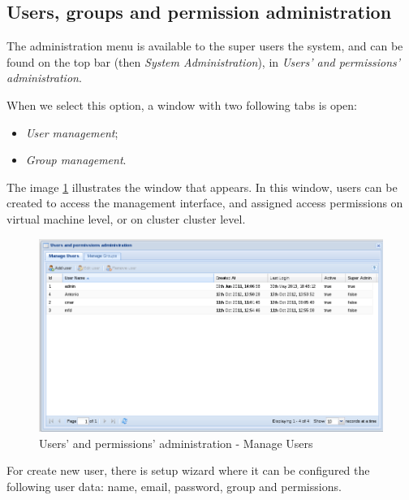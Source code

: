 \subsection{Users, groups and permission administration}
The administration menu is available to the super users the system, and can be found on the top bar (then \textit{System Administration}), in \textit{Users' and permissions' administration}.

When we select this option, a window with two following tabs is open:
\begin{itemize}
	\item \textit{User management};
	\item \textit{Group management}.
\end{itemize}

The image \ref{fig:admin_users} illustrates the window that appears. In this window, users can be created to access the management interface, and assigned access permissions on virtual machine level, or on cluster cluster level.

\begin{figure}[H]
        \begin{center}
        \includegraphics[scale=0.4]{screenshots/users/admin_users.png}
        \caption{Users' and permissions' administration - Manage Users}
        \label{fig:admin_users}
        \end{center}
\end{figure}

For create new user, there is setup wizard where it can be configured the following user data: name, email, password, group and permissions.

